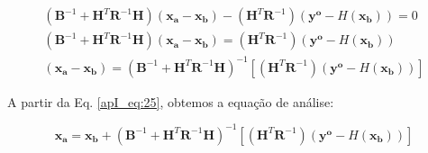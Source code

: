 \begin{align}
  \label{apI_eq:23}
  (\mathbf{B}^{-1} + \mathbf{H}^{T}\mathbf{R}^{-1}\mathbf{H})(\mathbf{x_{a}} - \mathbf{x_{b}}) - (\mathbf{H}^{T}\mathbf{R}^{-1})(\mathbf{y^{o}} - \textit{H}(\mathbf{x_{b}})) = 0 \\
  \label{apI_eq:24}
  (\mathbf{B}^{-1} + \mathbf{H}^{T}\mathbf{R}^{-1}\mathbf{H})(\mathbf{x_{a}} - \mathbf{x_{b}}) = (\mathbf{H}^{T}\mathbf{R}^{-1})(\mathbf{y^{o}} - \textit{H}(\mathbf{x_{b}})) \\
  \label{apI_eq:25}
  (\mathbf{x_{a}} - \mathbf{x_{b}}) = (\mathbf{B}^{-1} + \mathbf{H}^{T}\mathbf{R}^{-1}\mathbf{H})^{-1}[(\mathbf{H}^{T}\mathbf{R}^{-1})(\mathbf{y^{o}} - \textit{H}(\mathbf{x_{b}}))]
\end{align}

A partir da Eq. \ref{apI_eq:25}, obtemos a equação de análise:

\begin{equation}
  \label{apI_eq:26}
    \mathbf{x_{a}} = \mathbf{x_{b}} + (\mathbf{B}^{-1} + \mathbf{H}^{T}\mathbf{R}^{-1}\mathbf{H})^{-1}[(\mathbf{H}^{T}\mathbf{R}^{-1})(\mathbf{y^{o}} - \textit{H}(\mathbf{x_{b}}))]
\end{equation}